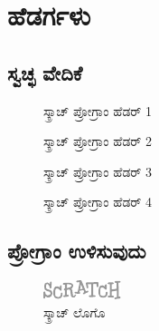\chapter{ಹೆಡರ್ಗಳು}

\section{ಸ್ವಚ್ಛ ವೇದಿಕೆ}
\begin{figure}[h]
\begin{center}
\begin{Scratch}[1]
\end{Scratch}
\end{center}
\caption{ಸ್ಕ್ರಾಚ್ ಪ್ರೋಗ್ರಾಂ ಹೆಡರ್ 1}
\label{hdr_init1}
\end{figure}

\begin{figure}[h]
\begin{center}
\begin{Scratch}[1]
\end{Scratch}
\end{center}
\caption{ಸ್ಕ್ರಾಚ್ ಪ್ರೋಗ್ರಾಂ ಹೆಡರ್ 2}
\label{hdr_init2}
\end{figure}


\begin{figure}[h]
\begin{center}
\begin{Scratch}[1]
\end{Scratch}
\end{center}
\caption{ಸ್ಕ್ರಾಚ್ ಪ್ರೋಗ್ರಾಂ ಹೆಡರ್ 3}
\label{hdr_init3}
\end{figure}


\begin{figure}[h]
\begin{center}
\begin{Scratch}[1]
\end{Scratch}
\end{center}
\caption{ಸ್ಕ್ರಾಚ್ ಪ್ರೋಗ್ರಾಂ ಹೆಡರ್ 4}
\label{hdr_init4}
\end{figure}

\section{ಪ್ರೋಗ್ರಾಂ ಉಳಿಸುವುದು}
\begin{figure}[h]
\begin{center}
\includegraphics[scale=2]{Scratchlogo.pdf}
\end{center}
\caption{ಸ್ಕ್ರಾಚ್ ಲೊಗೊ}
\label{hdr_logo}
\end{figure}


